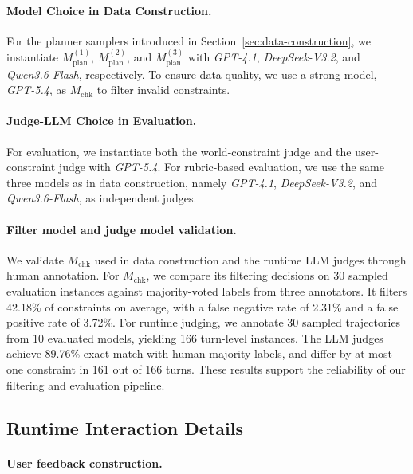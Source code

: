 \documentclass{llmxive}
\begin{document}
\paragraph{Model Choice in Data Construction.}
For the planner samplers introduced in Section~\ref{sec:data-construction}, we instantiate
$M_{\mathrm{plan}}^{(1)}$, $M_{\mathrm{plan}}^{(2)}$, and $M_{\mathrm{plan}}^{(3)}$
with \textit{GPT-4.1}, \textit{DeepSeek-V3.2}, and \textit{Qwen3.6-Flash},
respectively. To ensure data quality, we use a strong model, \textit{GPT-5.4}, as
$M_{\mathrm{chk}}$ to filter invalid constraints.

\paragraph{Judge-LLM Choice in Evaluation.}
For evaluation, we instantiate both the world-constraint judge and the user-constraint judge
with \textit{GPT-5.4}. 
For rubric-based evaluation, we use the same three models as in
data construction, namely \textit{GPT-4.1}, \textit{DeepSeek-V3.2}, and
\textit{Qwen3.6-Flash}, as independent judges.


\paragraph{Filter model and judge model validation.}
We validate $M_{\mathrm{chk}}$ used in data construction and the runtime LLM judges through human annotation. For $M_{\mathrm{chk}}$, we compare its filtering decisions on 30 sampled evaluation instances against majority-voted labels from three annotators. It filters 42.18\% of constraints on average, with a false negative rate of 2.31\% and a false positive rate of 3.72\%. For runtime judging, we annotate 30 sampled trajectories from 10 evaluated models, yielding 166 turn-level instances. The LLM judges achieve 89.76\% exact match with human majority labels, and differ by at most one constraint in 161 out of 166 turns. These results support the reliability of our filtering and evaluation pipeline.



\subsection{Runtime Interaction Details}
\label{app:runtime-interaction-details}


\paragraph{User feedback construction.}
\end{document}
